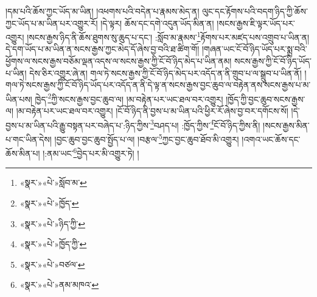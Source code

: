 །དམ་པའི་ཆོས་ཀྱང་ཡོད་མ་ཡིན། །འཕགས་པའི་བདེན་པ་རྣམས་མེད་ན། ལུང་དང་རྟོགས་པའི་བདག་ཉིད་ཀྱི་ཆོས་ཀྱང་ཡོད་པ་མ་ཡིན་པར་འགྱུར་རོ། །དེ་ལྟར། ཆོས་དང་དགེ་འདུན་ཡོད་མིན་ན། །སངས་རྒྱས་ཇི་ལྟར་ཡོད་པར་འགྱུར། །སངས་རྒྱས་ཉིད་ནི་ཆོས་ཐུགས་སུ་ཆུད་པ་དང་། :སློབ་མ་རྣམས་\footnote{«སྣར་»«པེ་»སློབ་མ་}རྟོགས་པར་མཛད་པས་འགྲུབ་པ་ཡིན་ན། དེ་དག་ཡོད་པ་མ་ཡིན་ན་སངས་རྒྱས་ཀྱང་མེད་དོ་ཞེས་བྱ་བའི་ཐ་ཚིག་གོ། །གཞན་ཡང་ངོ་བོ་ཉིད་ཡོད་པར་སྨྲ་བའི་ཕྱོགས་ལ་སངས་རྒྱས་བཅོམ་ལྡན་འདས་ལ་སངས་རྒྱས་ཀྱི་ངོ་བོ་ཉིད་མེད་པ་ཡིན་ནམ། སངས་རྒྱས་ཀྱི་ངོ་བོ་ཉིད་ཡོད་པ་ཡིན། དེས་ཅིར་འགྱུར་ཞེ་ན། གལ་ཏེ་སངས་རྒྱས་ཀྱི་ངོ་བོ་ཉིད་མེད་པར་འདོད་ན་ནི་གྲུབ་པ་ལ་སྒྲུབ་པ་ཡིན་ནོ། །གལ་ཏེ་སངས་རྒྱས་ཀྱི་ངོ་བོ་ཉིད་ཡོད་པར་འདོད་ན་ནི་དེ་ལྟ་ན་སངས་རྒྱས་བྱང་ཆུབ་ལ་བརྟེན་ནས་སངས་རྒྱས་པ་མ་ཡིན་པས། ཁྱེད་\footnote{«སྣར་»«པེ་»ཁྱོད་}ཀྱི་སངས་རྒྱས་བྱང་ཆུབ་ལ། །མ་བརྟེན་པར་ཡང་ཐལ་བར་འགྱུར། །ཁྱོད་ཀྱི་བྱང་ཆུབ་སངས་རྒྱས་ལ། །མ་བརྟེན་པར་ཡང་ཐལ་བར་འགྱུར། །ངོ་བོ་ཉིད་ནི་བྱས་པ་མ་ཡིན་པའི་ཕྱིར་རོ་ཞེས་བྱ་བར་དགོངས་སོ། །དེ་བྱས་པ་མ་ཡིན་པའི་རྒྱུ་བསྟན་པར་བཞེད་པ་:ཉིད་ཀྱིས་\footnote{«སྣར་»«པེ་»ཉིད་ཀྱི་}བཤད་པ། :ཁྱོད་ཀྱིས་\footnote{«སྣར་»«པེ་»ཁྱོད་ཀྱི་}ངོ་བོ་ཉིད་ཀྱིས་ནི། །སངས་རྒྱས་མིན་པ་གང་ཡིན་དེས། །བྱང་ཆུབ་བྱང་ཆུབ་སྤྱོད་པ་ལ། །བརྩལ་\footnote{«སྣར་»«པེ་»བཙལ་}ཀྱང་བྱང་ཆུབ་ཐོབ་མི་འགྱུར། །འགའ་ཡང་ཆོས་དང་ཆོས་མིན་པ། །:ནམ་ཡང་\footnote{«སྣར་»«པེ་»ནམ་མཁའ་}བྱེད་པར་མི་འགྱུར་ཏེ། །

